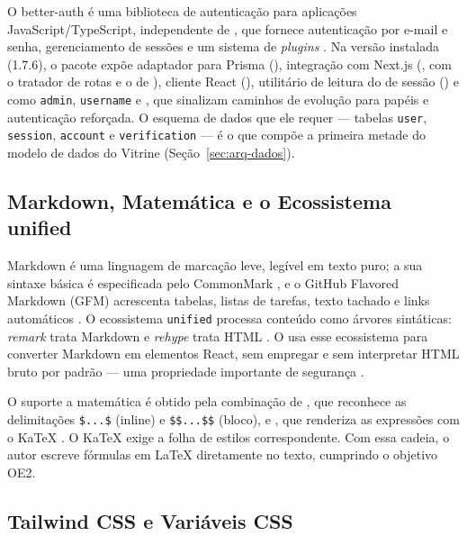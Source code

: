 O better-auth é uma biblioteca de autenticação para aplicações JavaScript/TypeScript, independente de , que fornece autenticação por e-mail e senha, gerenciamento de sessões e um sistema de \emph{plugins} \cite{betterauthdocs}. Na versão instalada (1.7.6), o pacote expõe adaptador para Prisma (), integração com Next.js (, com o tratador de rotas e o  de ), cliente React (), utilitário de leitura do  de sessão () e  como \texttt{admin}, \texttt{username} e , que sinalizam caminhos de evolução para papéis e autenticação reforçada. O esquema de dados que ele requer --- tabelas \texttt{user}, \texttt{session}, \texttt{account} e \texttt{verification} --- é o que compõe a primeira metade do modelo de dados do Vitrine (Seção~\ref{sec:arq-dados}).

\subsection{Markdown, Matemática e o Ecossistema unified}\label{sec:fund-markdown}

Markdown é uma linguagem de marcação leve, legível em texto puro; a sua sintaxe básica é especificada pelo CommonMark \cite{commonmark}, e o GitHub Flavored Markdown (GFM) acrescenta tabelas, listas de tarefas, texto tachado e links automáticos \cite{gfmspec}. O ecossistema \texttt{unified} processa conteúdo como árvores sintáticas: \emph{remark} trata Markdown e \emph{rehype} trata HTML \cite{unifiedjs}. O  usa esse ecossistema para converter Markdown em elementos React, sem empregar  e sem interpretar HTML bruto por padrão --- uma propriedade importante de segurança \cite{reactmarkdown}.

O suporte a matemática é obtido pela combinação de , que reconhece as delimitações \texttt{\$...\$} (inline) e \texttt{\$\$...\$\$} (bloco), e , que renderiza as expressões com o KaTeX \cite{katex}. O KaTeX exige a folha de estilos correspondente. Com essa cadeia, o autor escreve fórmulas em \LaTeX{} diretamente no texto, cumprindo o objetivo OE2.

\subsection{Tailwind CSS e Variáveis CSS}\label{sec:fund-css}

